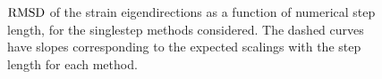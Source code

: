 \begin{figure}[htpb]
    \centering
    
    \caption[$\rmsd$ of the strain eigendirections as a function of numerical
    step length, for the singlestep methods considered]{$\rmsd$ of the strain
    eigendirections as a function of numerical step length, for the singlestep
    methods considered. The dashed curves have slopes
    corresponding to the expected scalings with the step length for each method.}
    \label{fig:xi2_err_fixed}
\end{figure}
